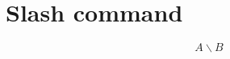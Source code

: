 \documentclass{article}
\renewcommand{\slash}{\backslash}
\begin{document}
\section{Slash command}

\[A\slash B\]
\end{document}
